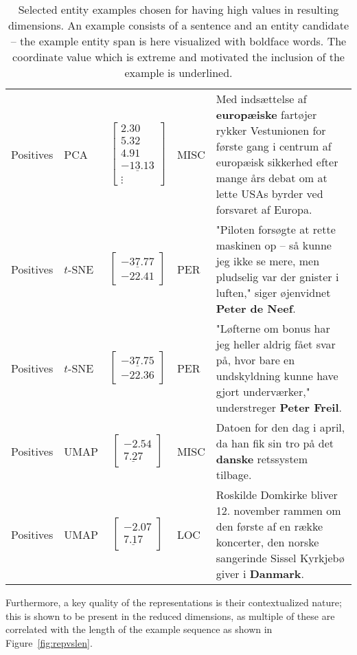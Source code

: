 \documentclass[main.tex]{subfiles}
\begin{document}
\begin{table}[H]
\begin{tabularx}{\linewidth}{llclX}
        Positives    & PCA       & $\begin{bmatrix}2.30\\5.32\\4.91\\\underline{-13.13}\\\vdots\end{bmatrix}$ & MISC        & Med indsættelse af \textbf{europæiske} fartøjer rykker Vestunionen for første gang i centrum af europæisk sikkerhed efter mange års debat om at lette USAs byrder ved forsvaret af Europa.\\

        Positives    & $t$-SNE       & $\begin{bmatrix}\underline{-37.77}\\-22.41\end{bmatrix}$ & PER        & "Piloten forsøgte at rette maskinen op -- så kunne jeg ikke se mere, men pludselig var der gnister i luften," siger øjenvidnet \textbf{Peter de Neef}.\\

        Positives    & $t$-SNE       & $\begin{bmatrix}\underline{-37.75}\\-22.36\end{bmatrix}$ & PER        & "Løfterne om bonus har jeg heller aldrig fået svar på, hvor bare en undskyldning kunne have gjort underværker," understreger \textbf{Peter Freil}.\\

        Positives    & UMAP       & $\begin{bmatrix}-2.54\\\underline{7.27}\end{bmatrix}$ & MISC       & Datoen for den dag i april, da han fik sin tro på det \textbf{danske} retssystem tilbage.\\

        Positives    & UMAP       & $\begin{bmatrix}-2.07\\\underline{7.17}\end{bmatrix}$ & LOC        & Roskilde Domkirke bliver 12. november rammen om den første af en række koncerter, den norske sangerinde Sissel Kyrkjebø giver i \textbf{Danmark}.

\end{tabularx}
    \caption{
        \footnotesize
        Selected entity examples chosen for having high values in resulting dimensions.
        An example consists of a sentence and an entity candidate -- the example entity span is here visualized with boldface words.
        The coordinate value which is extreme and motivated the inclusion of the example is underlined.
    }
    \label{tab:dimexamples}
\end{table}\noindent
Furthermore, a key quality of the representations is their contextualized nature; this is shown to be present in the reduced dimensions, as multiple of these are correlated with the length of the example sequence as shown in Figure~\ref{fig:repvslen}.
\end{document}
